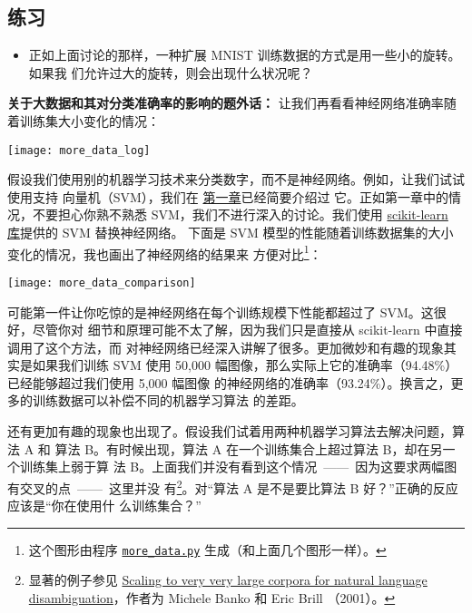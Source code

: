 \subsection*{练习}

\begin{itemize}
\item 正如上面讨论的那样，一种扩展 MNIST 训练数据的方式是用一些小的旋转。如果我
  们允许过大的旋转，则会出现什么状况呢？
\end{itemize}

\textbf{关于大数据和其对分类准确率的影响的题外话：} 让我们再看看神经网络准确率随
着训练集大小变化的情况：
\begin{center}
\texttt{[image: more\_data\_log]}
\end{center}

假设我们使用别的机器学习技术来分类数字，而不是神经网络。例如，让我们试试使用支持
向量机（SVM），我们在%
\hyperref[ch:UsingNeuralNetsToRecognizeHandwrittenDigits]{第一章}已经简要介绍过
它。正如第一章中的情况，不要担心你熟不熟悉 SVM，我们不进行深入的讨论。我们使用
\href{http://scikit-learn.org/stable/}{scikit-learn 库}提供的 SVM 替换神经网络。
下面是 SVM 模型的性能随着训练数据集的大小变化的情况，我也画出了神经网络的结果来
方便对比\footnote{这个图形由程序
  \href{https://github.com/mnielsen/neural-networks-and-deep-learning/blob/master/fig/more_data.py}{\lstinline!more_data.py!}
  生成（和上面几个图形一样）。}：
\begin{center}
\texttt{[image: more\_data\_comparison]}
\end{center}

可能第一件让你吃惊的是神经网络在每个训练规模下性能都超过了 SVM。这很好，尽管你对
细节和原理可能不太了解，因为我们只是直接从 scikit-learn 中直接调用了这个方法，而
对神经网络已经深入讲解了很多。更加微妙和有趣的现象其实是如果我们训练 SVM 使用
50,000 幅图像，那么实际上它的准确率（94.48\%）已经能够超过我们使用 5,000 幅图像
的神经网络的准确率（93.24\%）。换言之，更多的训练数据可以补偿不同的机器学习算法
的差距。

还有更加有趣的现象也出现了。假设我们试着用两种机器学习算法去解决问题，算法 A 和
算法 B。有时候出现，算法 A 在一个训练集合上超过算法 B，却在另一个训练集上弱于算
法 B。上面我们并没有看到这个情况~——~因为这要求两幅图有交叉的点~——~这里并没
有\footnote{显著的例子参见
  \href{http://dx.doi.org/10.3115/1073012.1073017}{Scaling to very very large
    corpora for natural language disambiguation}，作者为 Michele Banko 和 Eric
  Brill （2001）。}。对“算法 A 是不是要比算法 B 好？”正确的反应应该是“你在使用什
么训练集合？”

